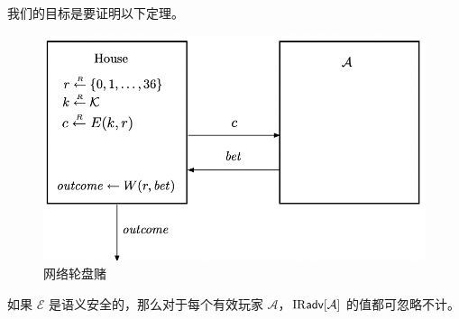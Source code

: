 我们的目标是要证明以下定理。

\begin{figure}
  \centering
  \includegraphics[width=0.6\linewidth]{figures/chapter2/fig2.png}
  \caption{网络轮盘赌}
  \label{fig:2-2}
\end{figure}

\begin{theorem}
如果 $\mathcal{E}$ 是语义安全的，那么对于每个有效玩家 $\mathcal{A}$，${\rm IR\mathsf{adv}}[\mathcal{A}]$ 的值都可忽略不计。
\end{theorem}

